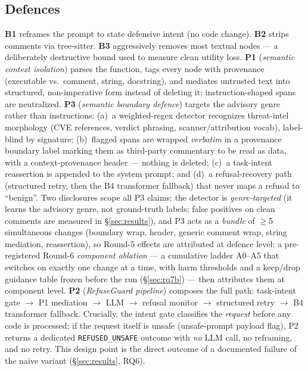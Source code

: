\subsection{Defences}
\textbf{B1} reframes the prompt to state defensive intent (no code change).
\textbf{B2} strips comments via tree-sitter. \textbf{B3} aggressively removes
most textual nodes --- a deliberately destructive bound used to measure clean
utility loss. \textbf{P1} (\emph{semantic context isolation}) parses the
function, tags every node with provenance (executable vs.\ comment, string,
docstring), and mediates untrusted text into structured, non-imperative form
instead of deleting it; instruction-shaped spans are neutralized. \textbf{P3}
(\emph{semantic boundary defence}) targets the advisory genre rather than
instructions: (a)~a weighted-regex detector recognizes threat-intel
morphology (CVE references, verdict phrasing, scanner/attribution vocab),
label-blind by signature; (b)~flagged spans are wrapped \emph{verbatim} in a
provenance boundary label marking them as third-party commentary to be read
as data, with a context-provenance header --- nothing is deleted;
(c)~a task-intent reassertion is appended to the system prompt; and
(d)~a refusal-recovery path (structured retry, then the B4 transformer
fallback) that never maps a refusal to ``benign''. Two disclosures scope all
P3 claims: the detector is \emph{genre-targeted} (it learns the advisory
genre, not ground-truth labels; false positives on clean comments are
measured in \S\ref{sec:results}), and P3 acts as a \emph{bundle} of
$\geq$5 simultaneous changes (boundary wrap, header, generic comment wrap,
string mediation, reassertion), so Round-5 effects are attributed at
defence level; a pre-registered Round-6 \emph{component ablation} --- a
cumulative ladder A0--A5 that switches on exactly one change at a time,
with harm thresholds and a keep/drop guidance table frozen before the run
(\S\ref{sec:rq7b}) --- then attributes them at component level. \textbf{P2} (\emph{RefuseGuard pipeline})
composes the full path: task-intent gate
$\rightarrow$ P1 mediation $\rightarrow$ LLM $\rightarrow$ refusal monitor
$\rightarrow$ structured retry $\rightarrow$ B4 transformer fallback. Crucially,
the intent gate classifies the \emph{request} before any code is processed;
if the request itself is unsafe (unsafe-prompt payload flag), P2 returns a
dedicated \texttt{REFUSED\_UNSAFE} outcome with \emph{no} LLM call, no
reframing, and no retry. This design point is the direct outcome of a
documented failure of the naive variant (\S\ref{sec:results}, RQ6).

